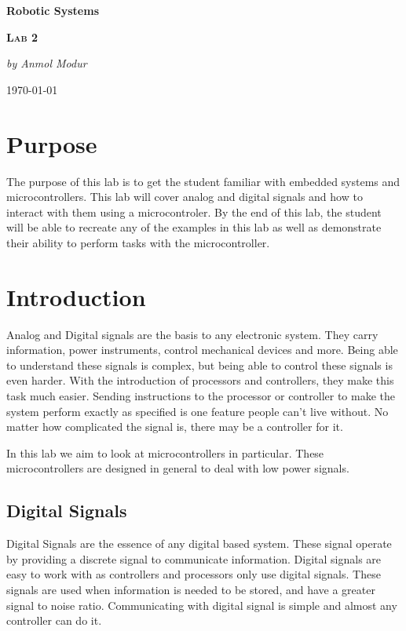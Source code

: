 \documentclass[12pt]{article}
\begin{document}
\begin{titlepage}
	\centering
	\vspace*{1.5in}
	{\Huge\bfseries Robotic Systems\par}
	\vspace{1in}
	{\scshape\LARGE\bfseries Lab 2\par}
	\vspace{2in}
	{\Large\itshape by Anmol Modur}
	\vfill

	{\large \today\par}
\end{titlepage}

\tableofcontents
\newpage
\section{Purpose}

The purpose of this lab is to get the student familiar with embedded systems and microcontrollers. This lab will cover analog and digital signals and how to interact with them using a microcontroler. By the end of this lab, the student will be able to recreate any of the examples in this lab as well as demonstrate their ability to perform tasks with the microcontroller. 

\section{Introduction}

Analog and Digital signals are the basis to any electronic system. They carry information, power instruments, control mechanical devices and more. Being able to understand these signals is complex, but being able to control these signals is even harder. With the introduction of processors and controllers, they make this task much easier. Sending instructions to the processor or controller to make the system perform exactly as specified is one feature people can't live without. No matter how complicated the signal is, there may be a controller for it. 

In this lab we aim to look at microcontrollers in particular. These microcontrollers are designed in general to deal with low power signals.

\subsection{Digital Signals}

Digital Signals are the essence of any digital based system. These signal operate by providing a discrete signal to communicate information. Digital signals are easy to work with as controllers and processors only use digital signals. These signals are used when information is needed to be stored, and have a greater signal to noise ratio. Communicating with digital signal is simple and almost any controller can do it. 
\end{document}
